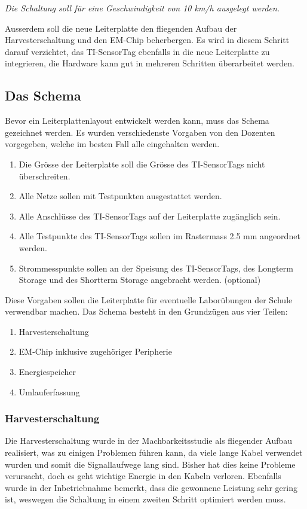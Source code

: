 \textit{Die Schaltung soll für eine Geschwindigkeit von 10 km/h ausgelegt werden.}

Ausserdem soll die neue Leiterplatte den fliegenden Aufbau der Harvesterschaltung und den EM-Chip beherbergen. Es wird in diesem Schritt darauf verzichtet, das TI-SensorTag ebenfalls in die neue Leiterplatte zu integrieren, die Hardware kann gut in mehreren Schritten überarbeitet werden.

\subsection{Das Schema}

Bevor ein Leiterplattenlayout entwickelt werden kann, muss das Schema gezeichnet werden. Es wurden verschiedenste Vorgaben von den Dozenten vorgegeben, welche im besten Fall alle eingehalten werden. 

\begin{enumerate}
    \item Die Grösse der Leiterplatte soll die Grösse des TI-SensorTags nicht überschreiten.
    \item Alle Netze sollen mit Testpunkten ausgestattet werden.
    \item Alle Anschlüsse des TI-SensorTags auf der Leiterplatte zugänglich sein.
    \item Alle Testpunkte des TI-SensorTags sollen im Rastermass 2.5 mm angeordnet werden.
	\item Strommesspunkte sollen an der Speisung des TI-SensorTags, des Longterm Storage und des Shortterm Storage angebracht werden. (optional)
\end{enumerate}

Diese Vorgaben sollen die Leiterplatte für eventuelle Laborübungen der Schule verwendbar machen. Das Schema besteht in den Grundzügen aus vier Teilen:

\begin{enumerate}
    \item Harvesterschaltung
    \item EM-Chip inklusive zugehöriger Peripherie
    \item Energiespeicher
    \item Umlauferfassung
\end{enumerate}

\subsubsection{Harvesterschaltung}
Die Harvesterschaltung wurde in der Machbarkeitsstudie als fliegender Aufbau realisiert, was zu einigen Problemen führen kann, da viele lange Kabel verwendet wurden und somit die Signallaufwege lang sind. Bisher hat dies keine Probleme verursacht, doch es geht wichtige Energie in den Kabeln verloren. Ebenfalls wurde in der Inbetriebnahme bemerkt, dass die gewonnene Leistung sehr gering ist, weswegen die Schaltung in einem zweiten Schritt optimiert werden muss.


